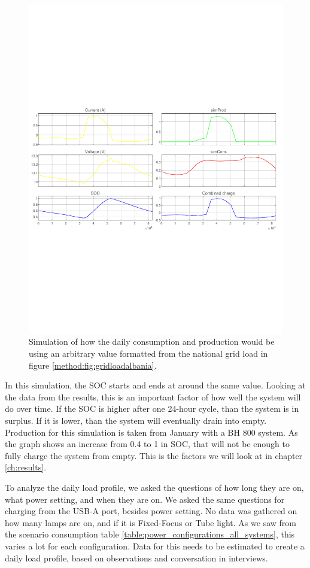 \begin{figure}[H]
    \centering
    \includegraphics[width=\linewidth]{photos/Method_simulation.pdf}
    \caption{Simulation of how the daily consumption and production would be using an arbitrary value formatted from the national grid load in  figure \ref{method:fig:gridloadalbania}.}
    \label{method:fig:method_simulation}
\end{figure}
In this simulation, the SOC starts and ends at around the same value. Looking at the data from the results, this is an important factor of how well the system will do over time. If the SOC is higher after one 24-hour cycle, than the system is in surplus. If it is lower, than the system will eventually drain into empty. Production for this simulation is taken from January with a BH 800 system. As the graph shows an increase from 0.4 to 1 in SOC, that will not be enough to fully charge the system from empty. This is the factors we will look at in chapter \ref{ch:results}.

To analyze the daily load profile, we asked the questions of how long they are on, what power setting, and when they are on. We asked the same questions for charging from the USB-A port, besides power setting. No data was gathered on how many lamps are on, and if it is Fixed-Focus or Tube light. As we saw from the scenario consumption table \ref{table:power_configurations_all_systems}, this varies a lot for each configuration. Data for this needs to be estimated to create a daily load profile, based on observations and conversation in interviews. 

